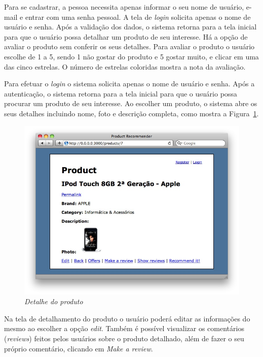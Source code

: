  Para se cadastrar, a pessoa necessita apenas informar o seu nome de usuário, e-mail e entrar com uma senha pessoal. A tela de \textit{login} solicita apenas o nome de usuário e senha. Após a validação dos dados, o sistema retorna para a tela inicial para que o usuário possa detalhar um produto de seu interesse. Há a opção de avaliar o produto sem conferir os seus detalhes. Para avaliar o produto o usuário escolhe de 1 a 5, sendo 1 não gostar do produto e 5 gostar muito, e clicar em uma das cinco estrelas. O número de estrelas coloridas mostra a nota da avaliação. 
 
 Para efetuar o \emph{login} o sistema solicita apenas o nome de usuário e senha. Após a autenticação, o sistema retorna para a tela inicial para que o usuário possa procurar um produto de seu interesse. Ao escolher um produto, o sistema abre os seus detalhes incluindo nome, foto e descrição completa, como mostra a Figura~\ref{fig:detalhe_produto_prototipo}.

\begin{figure}
  \centering
  \includegraphics[width=\textwidth]{imagens/Detalhe_Produto_Prototipo}
  \caption{\it Detalhe do produto}
  \label{fig:detalhe_produto_prototipo}
\end{figure}

 Na tela de detalhamento do produto o usuário poderá editar as informações do mesmo ao escolher a opção \textit{edit}. Também é possível visualizar os comentários (\textit{reviews}) feitos pelos usuários sobre o produto detalhado, além de fazer o seu próprio comentário, clicando em \textit{Make a review}.
  
